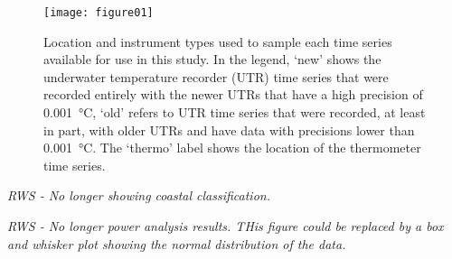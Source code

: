 \documentclass{ametsoc}
\begin{document}
%
\begin{figure}
\centering \texttt{[image: figure01]}
\caption[\small Location and instrument types used to sample each time series available for use in this study]{Location and instrument types used to sample each time series available for use in this study. In the legend, `new' shows the underwater temperature recorder (UTR) time series that were recorded entirely with the newer UTRs that have a high precision of \SI{0.001}{\degreeCelsius}, `old' refers to UTR time series that were recorded, at least in part, with older UTRs and have data with precisions lower than \SI{0.001}{\degreeCelsius}. The `thermo' label shows the location of the thermometer time series.}
\label{figure01}
\end{figure}

\emph{RWS - No longer showing coastal classification.}

\emph{RWS - No longer power analysis results. THis figure could be replaced by a box and whisker plot showing the normal distribution of the data.}
\end{document}
